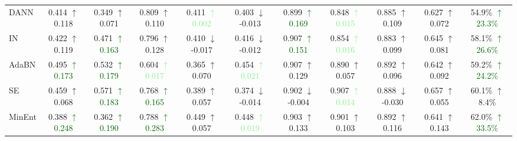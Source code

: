 \begin{table}
{\begin{tabular}{lcccccccccc}
			DANN        & 0.414 \textcolor{medGreen}{$\uparrow$0.118} & 0.349 \textcolor{medGreen}{$\uparrow$0.071} & 0.809 \textcolor{medGreen}{$\uparrow$0.110} & 0.411 \textcolor{lightGreen}{$\uparrow$0.002} & 0.403 \textcolor{lightRed}{$\downarrow$-0.013} & 0.899 \textcolor{darkGreen}{$\uparrow$0.169} & 0.848 \textcolor{lightGreen}{$\uparrow$0.015} & 0.885 \textcolor{medGreen}{$\uparrow$0.109} & 0.627 \textcolor{medGreen}{$\uparrow$0.072} & 54.9\% \textcolor{darkGreen}{$\uparrow$23.3\%} \\
			
			IN          & 0.422 \textcolor{medGreen}{$\uparrow$0.119} & 0.471 \textcolor{darkGreen}{$\uparrow$0.163} & 0.796 \textcolor{medGreen}{$\uparrow$0.128} & 0.410 \textcolor{lightRed}{$\downarrow$-0.017} & 0.416 \textcolor{lightRed}{$\downarrow$-0.012} & 0.907 \textcolor{darkGreen}{$\uparrow$0.151} & 0.854 \textcolor{lightGreen}{$\uparrow$0.016} & 0.883 \textcolor{medGreen}{$\uparrow$0.099} & 0.645 \textcolor{medGreen}{$\uparrow$0.081} & 58.1\% \textcolor{darkGreen}{$\uparrow$26.6\%} \\
			
			AdaBN       & 0.495 \textcolor{darkGreen}{$\uparrow$0.173} & 0.532 \textcolor{darkGreen}{$\uparrow$0.179} & 0.604 \textcolor{lightGreen}{$\uparrow$0.017} & 0.365 \textcolor{medGreen}{$\uparrow$0.070} & 0.454 \textcolor{lightGreen}{$\uparrow$0.021} & 0.907 \textcolor{medGreen}{$\uparrow$0.129} & 0.890 \textcolor{medGreen}{$\uparrow$0.057} & 0.892 \textcolor{medGreen}{$\uparrow$0.096} & 0.642 \textcolor{medGreen}{$\uparrow$0.092} & 59.2\% \textcolor{darkGreen}{$\uparrow$24.2\%} \\
			
			SE          & 0.459 \textcolor{medGreen}{$\uparrow$0.068} & 0.571 \textcolor{darkGreen}{$\uparrow$0.183} & 0.768 \textcolor{darkGreen}{$\uparrow$0.165} & 0.389 \textcolor{medGreen}{$\uparrow$0.057} & 0.374 \textcolor{lightRed}{$\downarrow$-0.014} & 0.902 \textcolor{lightRed}{$\downarrow$-0.004} & 0.907 \textcolor{lightGreen}{$\uparrow$0.014} & 0.888 \textcolor{lightRed}{$\downarrow$-0.030} & 0.657 \textcolor{medGreen}{$\uparrow$0.055} & 60.1\% \enspace \textcolor{medGreen}{$\uparrow$8.4\%} \\
			
			MinEnt      & 0.388 \textcolor{darkGreen}{$\uparrow$0.248} & 0.362 \textcolor{darkGreen}{$\uparrow$0.190} & 0.788 \textcolor{darkGreen}{$\uparrow$0.283} & 0.449 \textcolor{medGreen}{$\uparrow$0.057} & 0.448 \textcolor{lightGreen}{$\uparrow$0.019} & 0.903 \textcolor{medGreen}{$\uparrow$0.133} & 0.901 \textcolor{medGreen}{$\uparrow$0.103} & 0.892 \textcolor{medGreen}{$\uparrow$0.116} & 0.641 \textcolor{medGreen}{$\uparrow$0.143} & 62.0\% \textcolor{darkGreen}{$\uparrow$33.5\%} \\
			

\end{tabular}}
\end{table}
